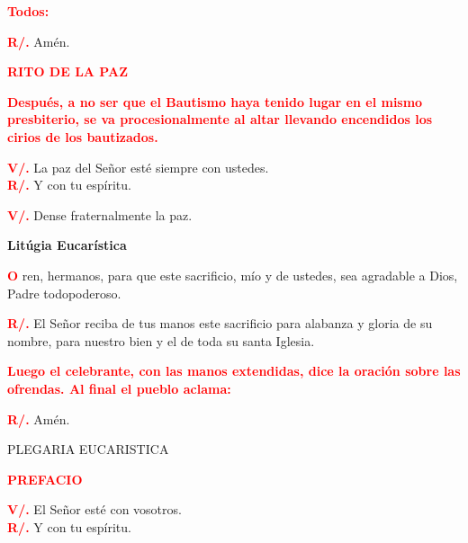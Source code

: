 \documentclass[12pt, letterpaper]{report}
\begin{document}
\large {\bfseries \textcolor{red}{Todos:}}

\noindent
\Large {\bfseries \textcolor{red}{R/.}} \hspace{0.5cm} Am\'en.

\Large {\bfseries \textcolor{red}{RITO DE LA PAZ}}

\large {\bfseries \textcolor{red}{Despu\'es, a no ser que el Bautismo haya tenido lugar en el mismo presbiterio, se va procesionalmente al altar llevando encendidos los cirios de los bautizados.}}

\noindent
\Large {\bfseries \textcolor{red}{V/.}} \hspace{0.5cm} La paz del Se\~nor est\'e siempre con ustedes. \\
\Large {\bfseries \textcolor{red}{R/.}} \hspace{0.5cm} Y con tu esp\'iritu. 

\noindent
\Large {\bfseries \textcolor{red}{V/.}} \hspace{0.5cm} Dense fraternalmente la paz. 

\newpage

\begin{center}
\Huge {\bfseries Lit\'ugia Eucar\'istica}
\end{center}

\lettrine[lines=1]{\bfseries \textcolor{red}{O}}{} \Large ren, hermanos, para que este sacrificio, m\'io y de ustedes, sea agradable a Dios, Padre todopoderoso. 

\noindent
\Large {\bfseries \textcolor{red}{R/.}} \hspace{0.5cm} El Se\~nor reciba de tus manos este sacrificio para alabanza y gloria de su nombre, para nuestro bien y el de toda su santa Iglesia. 

\large {\bfseries \textcolor{red}{Luego el celebrante, con las manos extendidas, dice la oraci\'on sobre las ofrendas. Al final el
pueblo aclama:}}

\noindent
\Large {\bfseries \textcolor{red}{R/.}} \hspace{0.5cm} Am\'en.

\begin{center}
\Large PLEGARIA EUCARISTICA
\end{center}


\Large {\bfseries \textcolor{red}{PREFACIO}}

\noindent
\Large {\bfseries \textcolor{red}{V/.}} \hspace{0.5cm} El Se\~nor est\'e con vosotros. \\
\Large {\bfseries \textcolor{red}{R/.}} \hspace{0.5cm} Y con tu esp\'iritu. 
\end{document}
